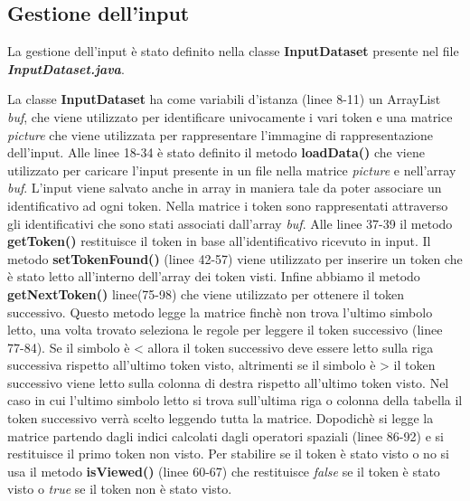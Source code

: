 \subsection{Gestione dell'input}
La gestione dell'input è stato definito nella classe \textbf{InputDataset} presente nel file \textbf{\textit{InputDataset.java}}.

La classe \textbf{InputDataset} ha come variabili d'istanza (linee 8-11) un ArrayList \textit{buf}, che viene utilizzato per identificare univocamente i vari token e una matrice \textit{picture} che viene utilizzata per rappresentare l'immagine di rappresentazione dell'input. Alle linee 18-34 è stato definito il metodo \textbf{loadData()} che viene utilizzato per caricare l'input presente in un file nella matrice \textit{picture} e nell'array \textit{buf}. L'input viene salvato anche in array in maniera tale da poter associare un identificativo ad ogni token. Nella matrice i token sono rappresentati attraverso gli identificativi che sono stati associati dall'array \textit{buf}. Alle linee 37-39 il metodo \textbf{getToken()} restituisce il token in base all'identificativo ricevuto in input. Il metodo \textbf{setTokenFound()} (linee 42-57) viene utilizzato per inserire un token che è stato letto all'interno dell'array dei token visti. Infine abbiamo il metodo \textbf{getNextToken()} linee(75-98) che viene utilizzato per ottenere il token successivo. Questo metodo legge la matrice finchè non trova l'ultimo simbolo letto, una volta trovato seleziona le regole per leggere il token successivo (linee 77-84). Se il simbolo è < allora il token successivo deve essere letto sulla riga successiva rispetto all'ultimo token visto, altrimenti se il simbolo è > il token successivo viene letto sulla colonna di destra rispetto all'ultimo token visto. Nel caso in cui l'ultimo simbolo letto si trova sull'ultima riga o colonna della tabella il token successivo verrà scelto leggendo tutta la matrice. Dopodichè si legge la matrice partendo dagli indici calcolati dagli operatori spaziali (linee 86-92) e si restituisce il primo token non visto. Per stabilire se il token è stato visto o no si usa il metodo \textbf{isViewed()} (linee 60-67) che restituisce \textit{false} se il token è stato visto o \textit{true} se il token non è stato visto.
